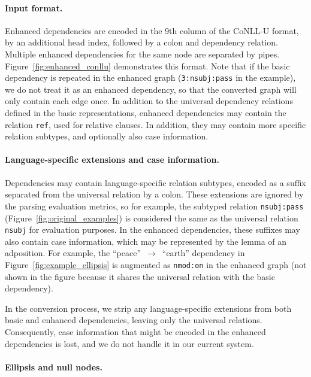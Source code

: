 \documentclass[11pt,a4paper]{article}
\begin{document}
\paragraph{Input format.}

Enhanced dependencies are encoded in the 9th column of the \mbox{CoNLL-U} format,
by an additional head index, followed by a colon and dependency relation.
Multiple enhanced dependencies for the same node are separated by pipes.
Figure~\ref{fig:enhanced_conllu} demonstrates this format.
Note that if the basic dependency is repeated in the enhanced graph
(\verb|3:nsubj:pass| in the example), we do not treat it as an enhanced 
dependency, so that the converted graph will only contain each edge once.
In addition to the universal dependency relations defined in the basic
representations, enhanced dependencies may contain the relation \verb|ref|,
used for relative clauses.
In addition, they may contain more specific relation subtypes,
and optionally also case information.

\paragraph{Language-specific extensions and case information.}

Dependencies may contain language-specific relation subtypes,
encoded as a suffix separated from the universal relation by a colon.
These extensions are ignored by the parsing evaluation metrics,
so for example, the subtyped relation \verb|nsubj:pass| (Figure~\ref{fig:original_examples})
is considered the same as the universal relation \verb|nsubj|
for evaluation purposes.
In the enhanced dependencies,
these suffixes may also contain case information,
which may be represented by the lemma of an adposition.
For example, the ``peace''~$\to$~``earth'' dependency in Figure~\ref{fig:example_ellipsis}
is augmented as \verb|nmod:on| in the enhanced graph
(not shown in the figure because it shares the universal relation with the basic dependency).

In the conversion process, we strip any language-specific extensions
from both basic and enhanced dependencies,
leaving only the universal relations.
Consequently, case information that might be encoded in the enhanced
dependencies is lost, and we do not handle it in our current system.

\paragraph{Ellipsis and null nodes.}
\end{document}
